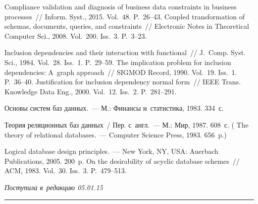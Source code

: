 \begin{multicols}{2}
{\small\frenchspacing
 {%
 \begin{thebibliography}{9}
 Compliance validation
and diagnosis of business data constraints in business processes~// Inform.
Syst., 2015. Vol.~48. P.~26--43.
 Coupled transformation of schemas, documents, queries, and
constraints~// Electronic Notes in
Theoretical Computer Sci., 2008. Vol.~200. Iss.~3. P.~3--23.


 Inclusion dependencies and their
interaction with functional~// J.~Comp. Syst. Sci., 1984. Vol.~28. Iss.~1.
P.~29--59.
 The implication problem for inclusion dependencies:
A~graph approach~// SIGMOD Record, 1990. Vol.~19. Iss.~1. P.~36--40.
 Justification for inclusion dependency normal
form~// IEEE Trans. Knowledge Data Eng., 2000. Vol.~12. Iss.~2.
P.~281--291.

 Основы систем баз данных.~--- М.: Финансы и~статистика,
1983. 334~с.

 Теория реляционных баз данных~/ Пер. с~англ.~--- М.: Мир, 1987. 608~с.
( The theory of relational databases.~--- Computer Science Press, 1983. 656~p.)

 Logical database design principles.~--- New
York, NY, USA: Auerbach Publications, 2005. 200~p.
 On the desirability of acyclic
database schemes~// ACM, 1983. Vol.~30. Iss.~3. P.~479--513.


  \end{thebibliography}

 }
 }

\end{multicols}

\vspace*{-3pt}

\hfill{\small\textit{Поступила в~редакцию 05.01.15}}


\vspace*{12pt}

\hrule

\vspace*{2pt}

